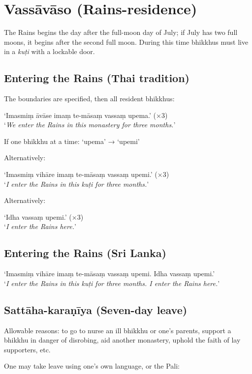 \section{Vassāvāso (Rains-residence)}

The Rains begins the day after the full-moon day of July; if July has two full
moons, it begins after the second full moon. During this time bhikkhus must live
in a \emph{kuṭi} with a lockable door.

\subsection{Entering the Rains (Thai tradition)}

The boundaries are specified, then all resident bhikkhus:

‘Imasmiṃ āvāse imaṃ te-māsaṃ vassaṃ upema.’ (×3)\\
‘\emph{We enter the Rains in this monastery for three months.}’

If one bhikkhu at a time: ‘upema’ → ‘upemi’

Alternatively:

‘Imasmiṃ vihāre imaṃ te-māsaṃ vassaṃ upemi.’ (×3)\\
‘\emph{I enter the Rains in this kuṭi for three months.}’

Alternatively:

‘Idha vassaṃ upemi.’ (×3)\\
‘\emph{I enter the Rains here.}’ 

\subsection{Entering the Rains (Sri Lanka)}

‘Imasmiṃ vihāre imaṃ te-māsaṃ vassaṃ upemi. Idha vassaṃ upemi.’\\
‘\emph{I enter the Rains in this kuṭi for three months. I enter the Rains
  here.}’

\subsection{Sattāha-karaṇīya (Seven-day leave)}

Allowable reasons: to go to nurse an ill bhikkhu or one's parents, support a
bhikkhu in danger of disrobing, aid another monastery, uphold the faith of lay
supporters, etc.

One may take leave using one's own language, or the Pali:

